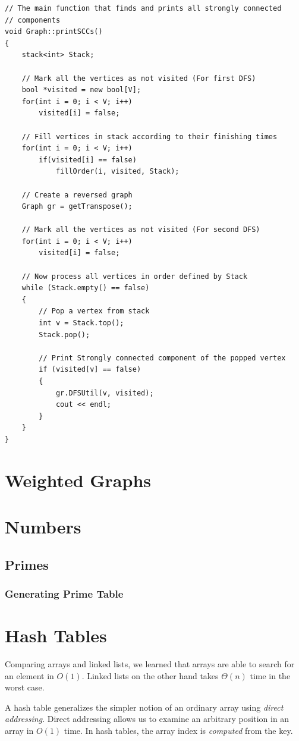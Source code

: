 \documentclass[]{book}
\begin{document}
\begin{verbatim}
// The main function that finds and prints all strongly connected
// components
void Graph::printSCCs()
{
	stack<int> Stack;

	// Mark all the vertices as not visited (For first DFS)
	bool *visited = new bool[V];
	for(int i = 0; i < V; i++)
		visited[i] = false;

	// Fill vertices in stack according to their finishing times
	for(int i = 0; i < V; i++)
		if(visited[i] == false)
			fillOrder(i, visited, Stack);

	// Create a reversed graph
	Graph gr = getTranspose();

	// Mark all the vertices as not visited (For second DFS)
	for(int i = 0; i < V; i++)
		visited[i] = false;

	// Now process all vertices in order defined by Stack
	while (Stack.empty() == false)
	{
		// Pop a vertex from stack
		int v = Stack.top();
		Stack.pop();

		// Print Strongly connected component of the popped vertex
		if (visited[v] == false)
		{
			gr.DFSUtil(v, visited);
			cout << endl;
		}
	}
}
      \end{verbatim}
  \chapter{Weighted Graphs}
  \chapter{Numbers}
    \section{Primes}
      \subsection*{Generating Prime Table}

  \chapter{Hash Tables}
    Comparing arrays and linked lists, we learned that arrays are able to search for an element
    in $O(1)$. Linked lists on the other hand takes $\Theta(n)$ time in the worst case.

    A hash table generalizes the simpler notion of an ordinary array using \textit{direct addressing}. 
    Direct addressing allows us to examine an arbitrary position in an array in $O(1)$ time. In
    hash tables, the array index is \textit{computed} from the key.
\end{document}
